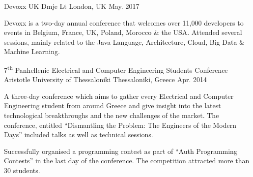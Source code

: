 \begin{cventries}
  \cventry
    {Devoxx UK} %
    {Dmje Lt} %
    {London, UK} %
    {May. 2017} %
    {
      \begin{cvitems} %
        \item {Devoxx is a two-day annual conference that welcomes over 11,000 developers to events in Belgium, France, UK, Poland, Morocco \& the USA. Attended several sessions, mainly related to the Java Language, Architecture,  Cloud, Big Data \& Machine Learning.}
      \end{cvitems}
    }

  \cventry
    {7\textsuperscript{th} Panhellenic Electrical and Computer Engineering Students Conference} %
    {Aristotle University of Thessaloniki} %
    {Thessaloniki, Greece} %
    {Apr. 2014} %
    {
      \begin{cvitems} %
        \item {A three-day conference which aims to gather every Electrical and Computer Engineering student from around Greece and give insight into the latest technological breakthroughs and the new challenges of the market. The conference, entitled ``Dismantling the Problem: The Engineers of the Modern Days'' included talks as well as technical sessions.}
        \item {Successfully organised a programming contest as part of ``Auth Programming Contests'' in the last day of the conference. The competition attracted more than 30 students.}
      \end{cvitems}
    }

\end{cventries}
